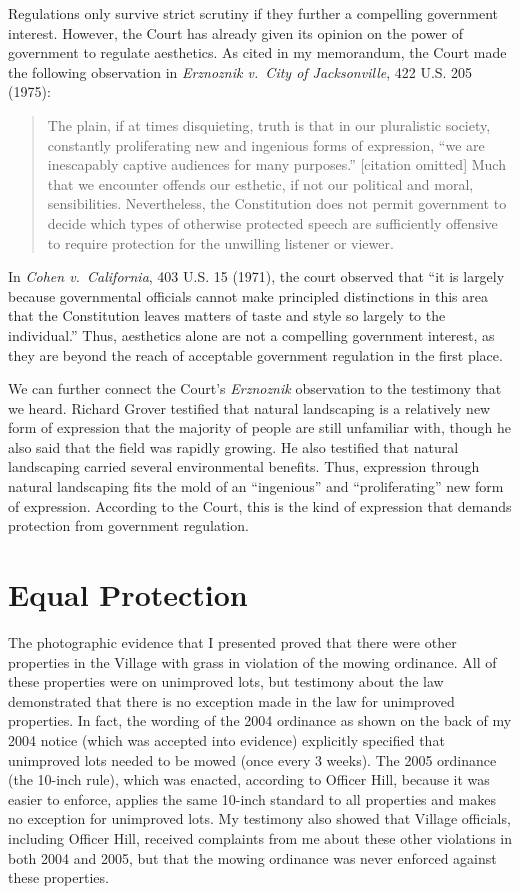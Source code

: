 \documentclass[12pt]{article}
\begin{document}
Regulations only survive strict scrutiny if they further a compelling government interest.
However, the Court has already given its opinion on the power of government to regulate aesthetics.
As cited in my memorandum, the Court made the following observation in {\em Erznoznik v.\ City of Jacksonville}, 422 U.S. 205 (1975): 
\begin{quote}
The plain, if at times disquieting, truth is that in our pluralistic society, constantly proliferating new and ingenious forms of expression, ``we are inescapably captive audiences for many purposes.'' [citation omitted]  Much that we encounter offends our esthetic, if not our political and moral, sensibilities. Nevertheless, the Constitution does not permit government to decide which types of otherwise protected speech are sufficiently offensive to require protection for the unwilling listener or viewer.
\end{quote}
In {\em Cohen v.\ California}, 403 U.S. 15 (1971), the court observed that ``it is largely because governmental officials cannot make principled distinctions in this area that the Constitution leaves matters of taste and style so largely to the individual.''
Thus, aesthetics alone are not a compelling government interest, as they are beyond the reach of acceptable government regulation in the first place.

We can further connect the Court's {\it Erznoznik} observation to the testimony that we heard.
Richard Grover testified that natural landscaping is a relatively new form of expression that the majority of people are still unfamiliar with, though he also said that the field was rapidly growing.
He also testified that natural landscaping carried several environmental benefits.
Thus, expression through natural landscaping fits the mold of an ``ingenious'' and ``proliferating'' new form of expression.
According to the Court, this is the kind of expression that demands protection from government regulation. 


\section{Equal Protection}
\label{equal_protection}

The photographic evidence that I presented proved that there were other properties in the Village with grass in violation of the mowing ordinance.
All of these properties were on unimproved lots, but testimony about the law demonstrated that there is no exception made in the law for unimproved properties.
In fact, the wording of the 2004 ordinance as shown on the back of my 2004 notice (which was accepted into evidence) explicitly specified that unimproved lots needed to be mowed (once every 3 weeks).
The 2005 ordinance (the 10-inch rule), which was enacted, according to Officer Hill, because it was easier to enforce, applies the same 10-inch standard to all properties and makes no exception for unimproved lots.   
My testimony also showed that Village officials, including Officer Hill, received complaints from me about these other violations in both 2004 and 2005, but that the mowing ordinance was never enforced against these properties. 
\end{document}
